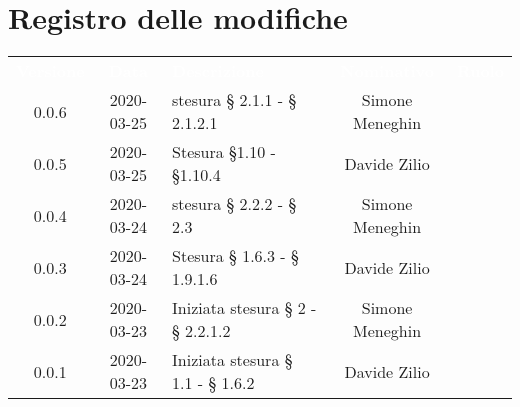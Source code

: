 
\section*{Registro delle modifiche}
{
	\renewcommand{\arraystretch}{1.5}
	\centering
	\begin{longtable}{ c c  C{4cm}  c  c }
		
		\textcolor{white}{\textbf{Versione}} & \textcolor{white}{\textbf{Data}} & \textcolor{white}{\textbf{Descrizione}} & \textcolor{white}{\textbf{Nominativo}} & \textcolor{white}{\textbf{Ruolo}}\\
		
		0.0.6 & 2020-03-25 & stesura § 2.1.1 - § 2.1.2.1 & Simone Meneghin &\reda{}\\	
		0.0.5 & 2020-03-25 & Stesura \S 1.10 - \S 1.10.4 & Davide Zilio & \reda{}\\

		0.0.4 & 2020-03-24 & stesura § 2.2.2 - § 2.3 & Simone Meneghin &\reda{}\\		
		
		0.0.3 & 2020-03-24 & Stesura § 1.6.3 - § 1.9.1.6 & Davide Zilio &\reda{}\\
		
		0.0.2 & 2020-03-23 & Iniziata stesura § 2 - § 2.2.1.2 & Simone Meneghin &\reda{}\\
		
		0.0.1 & 2020-03-23 & Iniziata stesura § 1.1 - § 1.6.2 & Davide Zilio &\reda{}\\		
		
	\end{longtable}

}